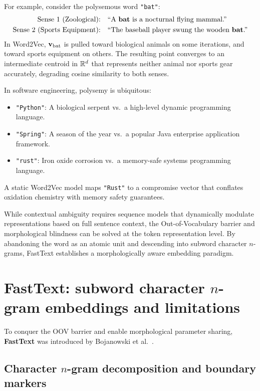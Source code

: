 \documentclass[../../../main.tex]{subfiles}
\begin{document}
For example, consider the polysemous word \texttt{"bat"}:
\begin{align*}
\text{Sense 1 (Zoological):} \quad &\text{``A \textbf{bat} is a nocturnal flying mammal.''} \\
\text{Sense 2 (Sports Equipment):} \quad &\text{``The baseball player swung the wooden \textbf{bat}.''}
\end{align*}
In Word2Vec, $\mathbf{v}_{\text{bat}}$ is pulled toward biological animals on some iterations, and toward sports equipment on others. The resulting point converges to an intermediate centroid in $\mathbb{R}^d$ that represents neither animal nor sports gear accurately, degrading cosine similarity to both senses.

In software engineering, polysemy is ubiquitous:
\begin{itemize}
    \item \texttt{"Python"}: A biological serpent vs.~a high-level dynamic programming language.
    \item \texttt{"Spring"}: A season of the year vs.~a popular Java enterprise application framework.
    \item \texttt{"rust"}: Iron oxide corrosion vs.~a memory-safe systems programming language.
\end{itemize}
A static Word2Vec model maps \texttt{"Rust"} to a compromise vector that conflates oxidation chemistry with memory safety guarantees.

While contextual ambiguity requires sequence models that dynamically modulate representations based on full sentence context, the Out-of-Vocabulary barrier and morphological blindness can be solved at the token representation level. By abandoning the word as an atomic unit and descending into subword character $n$-grams, FastText establishes a morphologically aware embedding paradigm.

\clearpage


\clearpage
\section{FastText: subword character $n$-gram embeddings and limitations}
\label{sec:fasttext_subwords}

To conquer the OOV barrier and enable morphological parameter sharing, \textbf{FastText} was introduced by Bojanowski et al.~\cite{bojanowski2017}.

\subsection{Character \texorpdfstring{$n$}{n}-gram decomposition and boundary markers}
\label{subsec:character_ngrams}
\end{document}
